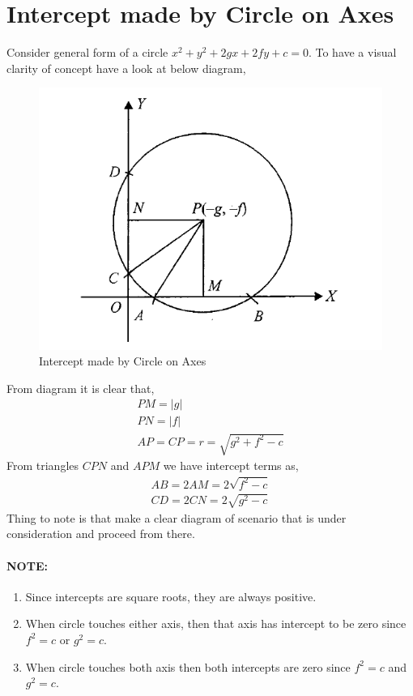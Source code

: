 \documentclass{article}
\begin{document}
\section{Intercept made by Circle on Axes}
Consider general form of a circle $x^2+y^2+2gx+2fy+c=0$. To have a visual clarity of concept have a look at below diagram,
\begin{figure}[H]
    \centering
    \includegraphics[scale=0.5]{circle_interecpt_on_axes.png}
    \caption{Intercept made by Circle on Axes}
\end{figure}
From diagram it is clear that,
\begin{align*}
    PM=|g|\\
    PN=|f|\\
    AP=CP=r=\sqrt{g^2+f^2-c}
\end{align*}
From triangles $CPN$ and $APM$ we have intercept terms as,
\begin{align*}
    AB=2AM=2\sqrt{f^2-c}\\
    CD=2CN=2\sqrt{g^2-c}
\end{align*}
Thing to note is that make a clear diagram of scenario that is under consideration and proceed from there.
\paragraph{\textbf{NOTE:}}
\begin{enumerate}
    \item Since intercepts are square roots, they are always positive.
    \item When circle touches either axis, then that axis has intercept to be zero since $f^2=c$ or $g^2=c$.
    \item When circle touches both axis then both intercepts are zero since $f^2=c$ and $g^2=c$.
\end{enumerate}
\end{document}
